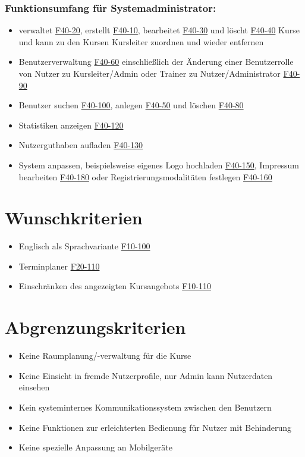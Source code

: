 \documentclass[a4paper]{scrreprt}
\begin{document}
		\subsubsection{Funktionsumfang für Systemadministrator:}
			\begin{itemize}
				\item verwaltet \hyperlink{kursVerwalt}{F40-20}, erstellt \hyperlink{kursErstellen}{F40-10}, bearbeitet \hyperlink{kursBearbeiten}{F40-30} und löscht \hyperlink{kursLoeschen}{F40-40} Kurse und kann zu den Kursen Kursleiter zuordnen \hyperlink{kursKLAdd}{} und wieder entfernen \hyperlink{kursKLDel}{}
				\item Benutzerverwaltung \hyperlink{nutzerVerwalt}{F40-60} einschließlich der Änderung einer Benutzerrolle von Nutzer zu Kursleiter/\gls{Admin} oder \gls{Trainer} zu Nutzer/Administrator \hyperlink{nutzerRolle}{F40-90}
				\item Benutzer suchen \hyperlink{nutzerSuchen}{F40-100}, anlegen \hyperlink{nutzerAnlegen}{F40-50} und löschen \hyperlink{nutzerLoeschen}{F40-80}
				\item Statistiken anzeigen \hyperlink{statistik}{F40-120}
				\item Nutzerguthaben aufladen \hyperlink{guthabenAuf}{F40-130}
				\item System anpassen, beispielsweise eigenes Logo hochladen \hyperlink{logo}{F40-150}, Impressum bearbeiten \hyperlink{impressumBea}{F40-180} oder Registrierungsmodalitäten festlegen \hyperlink{regMod}{F40-160}
			\end{itemize}
			
    \section{Wunschkriterien}
			\begin{itemize}
				\item Englisch als Sprachvariante \hyperlink{spracheAendern}{F10-100}
				\item Terminplaner \hyperlink{terminplaner}{F20-110}
	     		\item Einschränken des angezeigten Kursangebots \hyperlink{kursEinschraenken}{F10-110}
			\end{itemize}
			
	\section{Abgrenzungskriterien}
     		\begin{itemize}
	     		\item Keine Raumplanung/-verwaltung für die Kurse
	     		\item Keine Einsicht in fremde Nutzerprofile, nur Admin kann Nutzerdaten einsehen
	     		\item Kein systeminternes Kommunikationssystem zwischen den Benutzern
	     		\item Keine Funktionen zur erleichterten Bedienung für Nutzer mit Behinderung
	     		\item Keine spezielle Anpassung an Mobilgeräte
     		\end{itemize}
        
\end{document}
